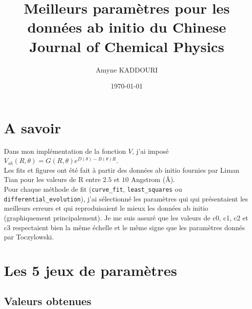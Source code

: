 \documentclass[10pt,a4paper]{article}
\title{\textbf{Meilleurs paramètres pour les données ab initio du Chinese Journal of Chemical Physics}}
\author{Amyne KADDOURI}
\date{\today}
\begin{document}
\maketitle

\tableofcontents
\newpage


\section{A savoir}

Dans mon implémentation de la fonction $V$, j'ai imposé 
$V_{sh}(R,\theta)=G(R,\theta)e^{D(\theta)-B(\theta)R}$.\\

Les fits et figures ont été fait à partir des données ab initio fournies par
Liman Tian pour les valeurs de R entre $2.5$ et $10$ Angstrom (\AA).\\

Pour chaque méthode de fit (\verb|curve_fit|, \verb|least_squares| ou 
\verb|differential_evolution|), j'ai sélectionné les paramètres qui qui 
présentaient les meilleurs erreurs et qui reproduisaient le mieux les données
ab initio (graphiquement principalement). Je me suis assuré que les valeurs de 
c0, c1, c2 et c3 respectaient bien la même échelle et le même signe que les 
paramètres donnés par Toczylowski.\\

\section{Les 5 jeux de paramètres}

\subsection{Valeurs obtenues}
\end{document}
